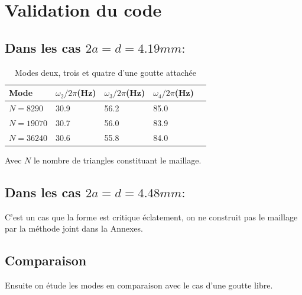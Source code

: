 \documentclass[a4paper]{report}
\begin{document}
\section{Validation du code}
\subsection{Dans les cas $2a = d = 4.19 mm :$}

\begin{table}[htp]
\begin{center}
    \begin{tabular}{ | l | l | l | l | l | }
    \hline
    Mode & $\omega_2/2\pi$(Hz) & $\omega_3/2\pi$(Hz) & $\omega_4/2\pi$(Hz) \\
    \hline
    $N = 8290$    & 30.9 & 56.2 & 85.0 \\ %
    \hline
    $N = 19070$   & 30.7 & 56.0 & 83.9 \\ %
    \hline
    $N = 36240$   & 30.6 & 55.8 & 84.0 \\ %
    \hline
    \end{tabular}
\end{center}
     \caption{Modes deux, trois et quatre d'une goutte attachée}
\end{table}
Avec $N$ le nombre de triangles constituant le maillage.
\subsection{Dans les cas $2a = d = 4.48 mm :$}
C'est un cas que la forme est critique éclatement, on ne construit pas le maillage par la méthode joint dans la Annexes.
\subsection{Comparaison}
Ensuite on étude les modes en comparaison avec le cas d'une goutte libre.
\end{document}
